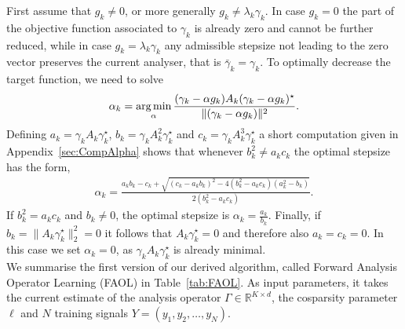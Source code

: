 \documentclass[11pt, onecolumn, journal,compsoc]{IEEEtran}
\newcommand{\R}{{\mathbb{R}}}
\DeclareMathOperator*{\argmin}{\text{arg\,min}}
\theoremstyle{plain}
\theoremstyle{remark}
\begin{document}
%
First assume that $g_k \neq 0$, or more generally $g_k \neq \lambda_k \gamma_k$. In case $g_k = 0$ the part of the objective function associated to $\gamma_k$ is already zero and cannot be further reduced, while in case $g_k = \lambda_k \gamma_k$ any admissible stepsize not leading to the zero vector preserves the current analyser, that is $\bar \gamma_k = \gamma_k$. To optimally decrease the target function, we need to solve
\begin{equation}\label{eq:alphaCondition}
\alpha_k = \argmin_{\alpha} \frac{(\gamma_k -\alpha g_k)A_k(\gamma_k - \alpha g_k)^\star}{\|(\gamma_k -\alpha g_k)\|^2}.
\end{equation}
Defining $a_k =\gamma_k A_k\gamma_k^\star$, $b_k = \gamma_k A_k^2\gamma_k^\star$ and $c_k = \gamma_k A_k^3\gamma_k^\star$ a short computation given in Appendix~\ref{sec:CompAlpha} shows that whenever $b_k^2 \neq a_kc_k$ the optimal stepsize has the form,
\begin{align*}
\alpha_k = \frac{a_kb_k-c_k+\sqrt{(c_k-a_kb_k)^2 - 4(b_k^2-a_kc_k)(a_k^2-b_k)}}{2(b_k^2-a_kc_k)}.
\end{align*}
If $b_k^2 = a_kc_k$ and $b_k\neq 0$, the optimal stepsize is $\alpha_k = \frac{a_k}{b_k}$.
Finally, if $b_k =\|A_k\gamma_k^\star\|_2^2= 0$ it follows that $A_k\gamma_k^\star = 0$ and therefore also $a_k = c_k = 0$. In this case we set $\alpha_k = 0$, as $\gamma_k A_k\gamma_k^\star$ is already minimal.\\
%
We summarise the first version of our derived algorithm, called Forward Analysis Operator Learning (FAOL) in Table~\ref{tab:FAOL}. As input parameters, it takes the current estimate of the analysis operator $\Gamma \in \R^{K\times d}$, the cosparsity parameter $\ell$ and $N$ training signals $Y=(y_1,y_2,\ldots, y_N)$.
%
\end{document}

